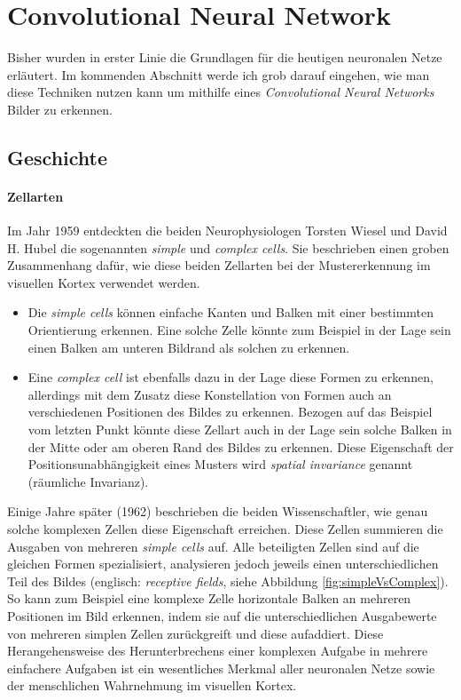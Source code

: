 \section{Convolutional Neural Network} \label{sc:cnn}
Bisher wurden in erster Linie die Grundlagen für die heutigen neuronalen Netze erläutert. Im kommenden Abschnitt werde ich grob darauf eingehen, wie man diese Techniken nutzen kann um mithilfe eines \emph{Convolutional Neural Networks} Bilder zu erkennen. 


\subsection{Geschichte}

\paragraph{Zellarten} 
Im Jahr 1959 entdeckten die beiden Neurophysiologen Torsten Wiesel und David H. Hubel die sogenannten \emph{simple} und \emph{complex cells}. Sie beschrieben einen groben Zusammenhang dafür, wie diese beiden Zellarten bei der Mustererkennung im visuellen Kortex verwendet werden. 

\begin{itemize}
\item Die \emph{simple cells} können einfache Kanten und Balken mit einer bestimmten Orientierung erkennen. Eine solche Zelle könnte zum Beispiel in der Lage sein einen Balken am unteren Bildrand als solchen zu erkennen. 

\item Eine \emph{complex cell} ist ebenfalls dazu in der Lage diese Formen zu erkennen, allerdings mit dem Zusatz diese Konstellation von Formen auch an verschiedenen Positionen des Bildes zu erkennen. Bezogen auf das Beispiel vom letzten Punkt könnte diese Zellart auch in der Lage sein solche Balken in der Mitte oder am oberen Rand des Bildes zu erkennen. Diese Eigenschaft der Positionsunabhängigkeit eines Musters wird \emph{spatial invariance} genannt (\glqq räumliche Invarianz\grqq ).
\end{itemize}

Einige Jahre später (1962) beschrieben die beiden Wissenschaftler, wie genau solche komplexen Zellen diese Eigenschaft erreichen. Diese Zellen summieren die Ausgaben von mehreren \emph{simple cells} auf. Alle beteiligten Zellen sind auf die gleichen Formen spezialisiert, analysieren jedoch jeweils einen unterschiedlichen Teil des Bildes (englisch: \emph{receptive fields}, siehe Abbildung \ref{fig:simpleVsComplex}). So kann zum Beispiel eine komplexe Zelle horizontale Balken an mehreren Positionen im Bild erkennen, indem sie auf die unterschiedlichen Ausgabewerte von mehreren simplen Zellen zurückgreift und diese aufaddiert. Diese Herangehensweise des Herunterbrechens einer komplexen Aufgabe in mehrere einfachere Aufgaben ist ein wesentliches Merkmal aller neuronalen Netze sowie der menschlichen Wahrnehmung im visuellen Kortex. 

